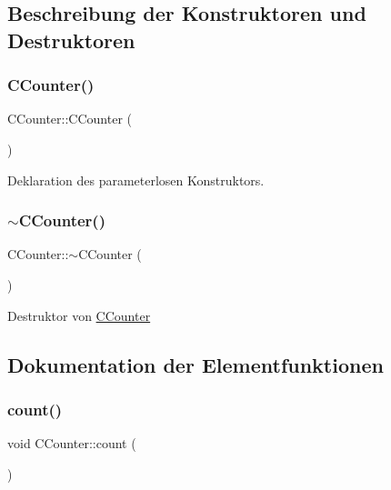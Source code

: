 \subsection{Beschreibung der Konstruktoren und Destruktoren}
\mbox{\label{class_c_counter_ab83c6f9600beb5686747493da731a04c}} 
\subsubsection{\texorpdfstring{C\+Counter()}{CCounter()}}
{\footnotesize\ttfamily C\+Counter\+::\+C\+Counter (\begin{DoxyParamCaption}{ }\end{DoxyParamCaption})}

Deklaration des parameterlosen Konstruktors. \mbox{\label{class_c_counter_a1af3cc000781fcd67b9e4fe1b25fbc9c}} 
\subsubsection{\texorpdfstring{$\sim$\+C\+Counter()}{~CCounter()}}
{\footnotesize\ttfamily C\+Counter\+::$\sim$\+C\+Counter (\begin{DoxyParamCaption}{ }\end{DoxyParamCaption})\hspace{0.3cm}{\ttfamily [virtual]}}

Destruktor von \hyperlink{class_c_counter}{C\+Counter} 

\subsection{Dokumentation der Elementfunktionen}
\mbox{\label{class_c_counter_a90f3e164f3fc1dcf91044702d6940c4d}} 
\subsubsection{\texorpdfstring{count()}{count()}}
{\footnotesize\ttfamily void C\+Counter\+::count (\begin{DoxyParamCaption}{ }\end{DoxyParamCaption})\hspace{0.3cm}{\ttfamily [virtual]}}

